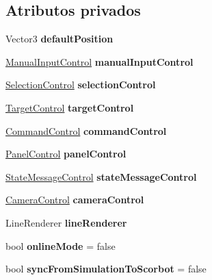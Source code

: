 \subsection*{Atributos privados}
\begin{DoxyCompactItemize}
\item 
\mbox{\label{class_game_controller_a978311a06af683b6d5fb6e0beac0d236}} 
Vector3 {\bfseries default\+Position}
\item 
\mbox{\label{class_game_controller_a8440f525b85dcb4243c88bfedfdab79d}} 
\mbox{\hyperlink{class_manual_input_control}{Manual\+Input\+Control}} {\bfseries manual\+Input\+Control}
\item 
\mbox{\label{class_game_controller_a81276753525e476bace62b49ee3ce507}} 
\mbox{\hyperlink{class_selection_control}{Selection\+Control}} {\bfseries selection\+Control}
\item 
\mbox{\label{class_game_controller_ab191758b0de66836d3b539cd48b4282e}} 
\mbox{\hyperlink{class_target_control}{Target\+Control}} {\bfseries target\+Control}
\item 
\mbox{\label{class_game_controller_a2e8ae36b7321f79de640ee75c2ce5bc0}} 
\mbox{\hyperlink{class_command_control}{Command\+Control}} {\bfseries command\+Control}
\item 
\mbox{\label{class_game_controller_ae8ef508d0590d03656f75b56449f1691}} 
\mbox{\hyperlink{class_panel_control}{Panel\+Control}} {\bfseries panel\+Control}
\item 
\mbox{\label{class_game_controller_a0d1838b386921e85e236d5c6f7cd72a4}} 
\mbox{\hyperlink{class_state_message_control}{State\+Message\+Control}} {\bfseries state\+Message\+Control}
\item 
\mbox{\label{class_game_controller_aadb2cddd5177e5f99b55841b5b0b9c0a}} 
\mbox{\hyperlink{class_camera_control}{Camera\+Control}} {\bfseries camera\+Control}
\item 
\mbox{\label{class_game_controller_a3bccbef8df8f2586edd74ba0013ec357}} 
Line\+Renderer {\bfseries line\+Renderer}
\item 
\mbox{\label{class_game_controller_a08c2e64ae7139eba0487f697aa298d31}} 
bool {\bfseries online\+Mode} = false
\item 
\mbox{\label{class_game_controller_ad73824064692e5e0e0b51106f962fc16}} 
bool {\bfseries sync\+From\+Simulation\+To\+Scorbot} = false
\end{DoxyCompactItemize}


